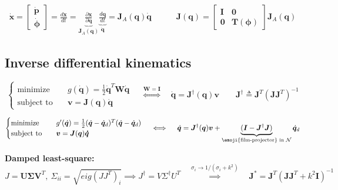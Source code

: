\begin{gather*}
\dot{\bm{x}}
=
\begin{bmatrix} \dot{\bm{p}} \\ \dot{\bm{\phi}}\end{bmatrix}
=
\frac{d\bm{x}}{dt}
=
\underbrace{\frac{\partial\bm{x}}{\partial \bm{q}}}_{\bm{J}_A(\bm{q})}
\underbrace{\frac{d\bm{q}}{d t}}_{\dot{\bm{q}}}
=
\bm{J}_A(\bm{q})\dot{\bm{q}}
\quad \qquad
\bm{J}(\bm{q})
=
\begin{bmatrix}
	\bm{I} & \bm{0} \\
	\bm{0} & \bm{T}(\bm{\phi})
\end{bmatrix}
\bm{J}_A(\bm{q})
\end{gather*}


\vspace*{-5pt}
\subsection{Inverse differential kinematics}
\begin{equation*}
\begin{cases}
\text{minimize} & \quad g(\dot{\bm{q}}) = \frac{1}{2} \dot{\bm{q}}^T \bm{W} \dot{\bm{q}} \\
\text{subject to} & \quad \bm{v} = \bm{J}(\bm{q})\bm{\dot{q}}
\end{cases}
\quad 
\overset{\bm{W} = \bm{I}}{\iff}
\quad
\dot{\bm{q}} = \bm{J}^{\dagger}(\bm{q})\bm{v}
\qquad
\bm{J}^{\dagger} \triangleq \bm{J}^T(\bm{J}\bm{J}^T)^{-1}
\end{equation*}

\vspace{10pt}

\begin{equation*}
\begin{cases}
	\text{minimize} & \quad 
	g'(\dot{\bm{q}}) = \frac{1}{2} ( \dot{\bm{q}} - \dot{\bm{q}}_d )^T ( \dot{\bm{q}} - \dot{\bm{q}}_d ) \\
	\text{subject to} & \quad \bm{v} = \bm{J}(\bm{q})\bm{\dot{q}}
\end{cases}
\quad 
\iff
\quad
\dot{\bm{q}} = \bm{J}^{\dagger}(\bm{q})\bm{v}
+
\underbrace{(\bm{I} - \bm{J}^\dagger\bm{J})}_{\text{\emoji{film-projector} in }\mathcal{N}}
\dot{\bm{q}}_d
\end{equation*}

\vspace*{5pt}
\textbf{Damped least-square: }
$$
J = \bm{U\Sigma V}^T , \ \Sigma_{ii} = \sqrt{eig(JJ^T)_i}
\implies
J^\dagger = V\Sigma^\dagger U^T
\quad \overset{\sigma_i \rightarrow 1/(\sigma_i + k^2)}{\implies} \quad
\bm{J}^* = \bm{J}^T(\bm{J}\bm{J}^T + k^2\bm{I})^{-1}
$$

